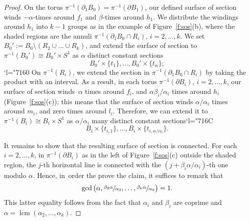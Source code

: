\documentclass[JEP,XML,SOM,Unicode,published]{cedram}
\newcommand{\Changel}{\mathcode`l="7160}
\newcommand{\Changelback}{\mathcode`l="716C}
\theoremstyle{definition}
\DeclareMathOperator{\lcm}{lcm}
\begin{document}
\begin{proof}
On the torus $\pi^{-1}(\partial_1 B_0)=\pi^{-1}(\partial B_1)$, our defined surface of section winds $- \alpha$\nobreakdash-times around $f_1$ and $ \beta$-times around $h_1$. We distribute the windings around $h_1$ into $k-1$ groups as in the example of Figure~\ref{f:sos}(b), where the shaded regions are the annuli $\pi^{-1}(\partial_1 B_0 \cap R_i)$, $i=2,\dots,k$. We set $B_0':=B_0\setminus (R_2\cup\dots\cup R_k)$, and extend the surface of section to $\pi^{-1}(B_0')\cong B_0'\times S^1$ as $\alpha$ distinct constant sections
\[
B_0'\times\{t_1\},\dots, B_0'\times\{t_{\alpha}\};
\]
\Changel
On $\pi^{-1}(R_i)$, we extend the section in $\pi^{-1}(\partial_1 B_0 \cap R_i)$ by taking the product with an interval. As a result, in each torus $\pi^{-1}(\partial B_i)$, $i=2,\dots,k$, our surface of section winds~$\alpha$ times around $f_i$, and $\alpha\beta_i/\alpha_i$ times around $h_i$ (Figure~\ref{f:sos}(c)); this means that the surface of section winds $\alpha/\alpha_i$ times around $m_i$, and zero times around $l_i$. Therefore, we can extend it to $\pi^{-1}(B_i)\cong B_i\times S^1$ as $\alpha/\alpha_i$ many distinct constant sections\Changelback
\[
B_i\times\{t_{i,1}\},\dots,B_i\times\{t_{i,\alpha/\alpha_i}\}.
\]

It remains to show that the resulting surface of section is connected. For each $i=2,\dots,k$, in $\pi^{-1}(\partial B_i)$ as in the left of Figure~\ref{f:sos}(c) outside the shaded region, the $j$-th horizontal line is connected with the $(j+ \beta_i\alpha/\alpha_i)$-th one modulo $\alpha$. Hence, in~order the prove the claim, it suffices to remark that
\[
\gcd\big( \alpha, \sfrac{\beta_2 \alpha}{\alpha_2},\dots, \sfrac{\beta_k \alpha}{\alpha_k}\big) = 1.
\]
This latter equality follows from the fact that $\alpha_i$ and $\beta_i$ are coprime and $ \alpha=\lcm(\alpha_2,\dots,\alpha_k)$.
\end{proof}
\end{document}
